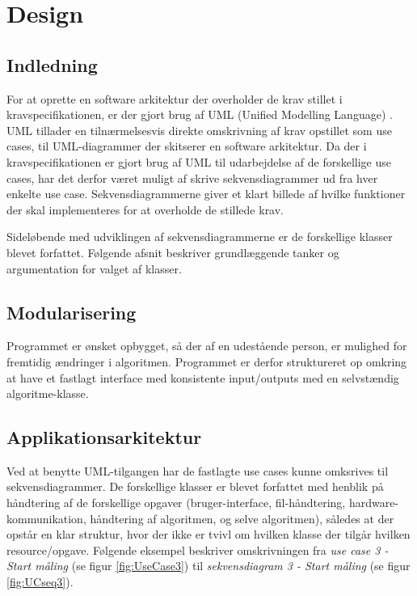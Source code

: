 \documentclass[rapport.tex]{subfiles}
\begin{document}
	\section{Design}
		\subsection{Indledning}
	For at oprette en software arkitektur der overholder de krav stillet i kravspecifikationen, er der gjort brug af UML (Unified Modelling Language) \cite{UML}. UML tillader en tilnærmelsesvis direkte omskrivning af krav opstillet som use cases, til UML-diagrammer der skitserer en software arkitektur. 
	Da der i kravspecifikationen er gjort brug af UML til udarbejdelse af de forskellige use cases, har det derfor været muligt af skrive sekvensdiagrammer ud fra hver enkelte use case. Sekvensdiagrammerne giver et klart billede af hvilke funktioner der skal implementeres for at overholde de stillede krav.  
	
	Sideløbende med udviklingen af sekvensdiagrammerne er de forskellige klasser blevet forfattet. Følgende afsnit beskriver grundlæggende tanker og argumentation for valget af klasser.

	
	\subsection{Modularisering}
	Programmet er ønsket opbygget, så der af en udestående person, er mulighed for fremtidig ændringer i algoritmen. Programmet er derfor struktureret op omkring at have et fastlagt interface med konsistente input/outputs med en selvstændig algoritme-klasse. 
	\subsection{Applikationsarkitektur}
	Ved at benytte UML-tilgangen har de fastlagte use cases kunne omksrives til sekvensdiagrammer. 
	De forskellige klasser er blevet forfattet med henblik på håndtering af de forskellige opgaver (bruger-interface, fil-håndtering, hardware-kommunikation, håndtering af algoritmen, og selve algoritmen), således at der opstår en klar struktur, hvor der ikke er tvivl om hvilken klasse der tilgår hvilken resource/opgave.
	Følgende eksempel beskriver omskrivningen fra \textit{use case 3 - Start måling} (se figur \ref{fig:UseCase3}) til \textit{sekvensdiagram 3 - Start måling} (se figur \ref{fig:UCseq3}).
\end{document}
